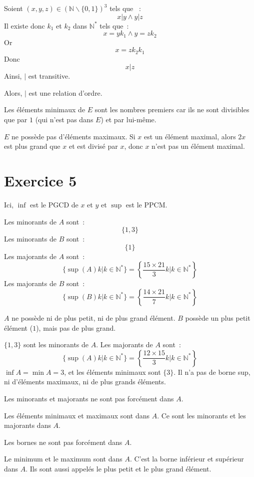 \documentclass[a4paper]{article}
\begin{document}
    Soient $(x,y,z)\in(\mathbb{N}\backslash\{0,1\})^3$ tels que ~: $$ x | y \land y | z $$
    Il existe donc $k_1$ et $k_2$ dans $\mathbb{N}^*$ tels que~: $$ x = yk_1 \land y = zk_2 $$
    Or $$ x = zk_2k_1 $$
    Donc $$ x | z $$
    Ainsi, $|$ est transitive.

    Alors, $|$ est une relation d'ordre.

    Les éléments minimaux de $E$ sont les nombres premiers car ils ne sont divisibles que par $1$ (qui n'est pas dans 
    $E$) et par lui-même.

    $E$ ne possède pas d'éléments maximaux.
    Si $x$ est un élément maximal, alors $2x$ est plus grand que $x$ et est divisé par $x$, donc $x$ n'est pas un 
    élément maximal.
    \section*{Exercice 5}
    Ici, $\inf$ est le $\mathrm{PGCD}$ de $x$ et $y$ et $\sup$ est le $\mathrm{PPCM}$.

    Les minorants de $A$ sont~: $$ \{1,3\} $$
    Les minorants de $B$ sont~: $$ \{1\} $$
    Les majorants de $A$ sont~: $$ \{\sup(A)k | k \in\mathbb{N}^*\} = \left\{\frac{15\times 21}3k | k \in\mathbb{N}^*\right\} $$
    Les majorants de $B$ sont~: $$ \{\sup(B)k| k \in\mathbb{N}^*\} = \left\{\frac{14\times 21}7k | k \in\mathbb{N}^*\right\}$$

    $A$ ne possède ni de plus petit, ni de plus grand élément.
    $B$ possède un plus petit élément ($1$), mais pas de plus grand.

    $\{1,3\}$ sont les minorants de $A$.
    Les majorants de $A$ sont~: $$ \{\sup(A)k | k\in\mathbb{N}^*\} = \left\{\frac{12\times 15}{3}k | k\in\mathbb{N}^*\right\} $$
    $\inf A=\min A = 3$, et les éléments minimaux sont $\{3\}$.
    Il n'a pas de borne sup, ni d'éléments maximaux, ni de plus grands éléments.

    Les minorants et majorants ne sont pas forcément dans $A$.

    Les éléments minimaux et maximaux sont dans $A$.
    Ce sont les minorants et les majorants dans $A$.

    Les bornes ne sont pas forcément dans $A$.

    Le minimum et le maximum sont dans $A$.
    C'est la borne inférieur et supérieur dans $A$.
    Ils sont aussi appelés le plus petit et le plus grand élément.
\end{document}
